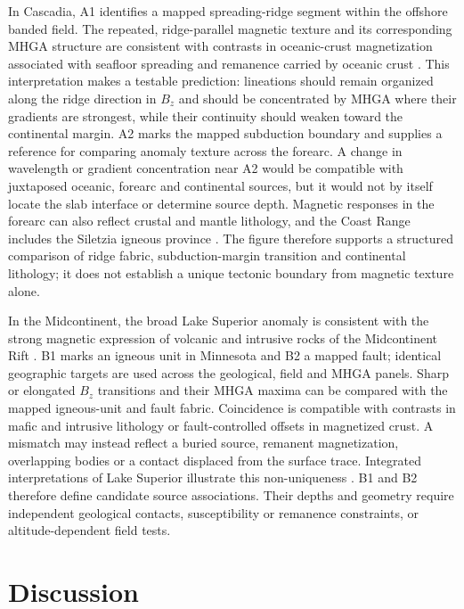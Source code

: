 ﻿\documentclass[11pt,a4paper]{article}
\begin{document}
In Cascadia, A1 identifies a mapped spreading-ridge segment within the offshore banded field. The repeated, ridge-parallel magnetic texture and its corresponding MHGA structure are consistent with contrasts in oceanic-crust magnetization associated with seafloor spreading and remanence carried by oceanic crust \citep{VineWilson1965,SetonEtAl2020}. This interpretation makes a testable prediction: lineations should remain organized along the ridge direction in $B_z$ and should be concentrated by MHGA where their gradients are strongest, while their continuity should weaken toward the continental margin. A2 marks the mapped subduction boundary and supplies a reference for comparing anomaly texture across the forearc. A change in wavelength or gradient concentration near A2 would be compatible with juxtaposed oceanic, forearc and continental sources, but it would not by itself locate the slab interface or determine source depth. Magnetic responses in the forearc can also reflect crustal and mantle lithology, and the Coast Range includes the Siletzia igneous province \citep{BlakelyEtAl2005,WellsEtAl2014}. The figure therefore supports a structured comparison of ridge fabric, subduction-margin transition and continental lithology; it does not establish a unique tectonic boundary from magnetic texture alone.

In the Midcontinent, the broad Lake Superior anomaly is consistent with the strong magnetic expression of volcanic and intrusive rocks of the Midcontinent Rift \citep{HinzeEtAl1992,SteinEtAl2015}. B1 marks an igneous unit in Minnesota and B2 a mapped fault; identical geographic targets are used across the geological, field and MHGA panels. Sharp or elongated $B_z$ transitions and their MHGA maxima can be compared with the mapped igneous-unit and fault fabric. Coincidence is compatible with contrasts in mafic and intrusive lithology or fault-controlled offsets in magnetized crust. A mismatch may instead reflect a buried source, remanent magnetization, overlapping bodies or a contact displaced from the surface trace. Integrated interpretations of Lake Superior illustrate this non-uniqueness \citep{GrauchEtAl2020}. B1 and B2 therefore define candidate source associations. Their depths and geometry require independent geological contacts, susceptibility or remanence constraints, or altitude-dependent field tests.





\FloatBarrier

\section{Discussion}
\label{sec:discussion}
\end{document}

